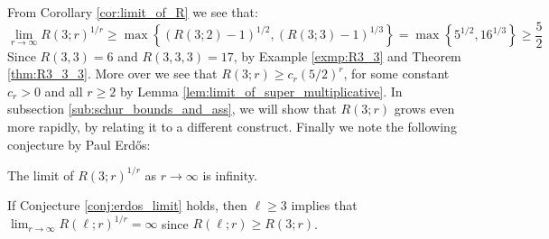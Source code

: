 From Corollary \ref{cor:limit_of_R} we see that:
\begin{equation*}
	\lim_{r \to \infty} R(3; r)^{1 / r} \geq \max \left\{(R(3; 2) - 1)^{1 / 2}, (R(3; 3) - 1)^{1/3}\right\}  = \max \left\{5^{1/2}, 16^{1/3}\right\} \geq \frac{5}{2}
\end{equation*}
Since $R(3, 3) = 6$ and $R(3, 3, 3) = 17$, by Example \ref{exmp:R3_3} and Theorem \ref{thm:R3_3_3}. More over we see that $R(3; r) \geq c_r (5 / 2)^r$, for some constant $c_r > 0$ and all $r \geq 2$ by Lemma \ref{lem:limit_of_super_multiplicative}. In subsection \ref{sub:schur_bounds_and_ass}, we will show that $R(3; r)$ grows even more rapidly, by relating it to a different construct.
Finally we note the following conjecture by Paul Erdős:
\begin{conjecture}[Erdős]\label{conj:erdos_limit}
	The limit of $R(3; r)^{1/r}$ as $r \to \infty$ is infinity.
\end{conjecture}
If Conjecture \ref{conj:erdos_limit} holds, then $\ell \geq 3$ implies that $\lim_{r \to \infty} R(\ell; r)^{1/r} = \infty$ since $R(\ell; r) \geq R(3; r)$.
